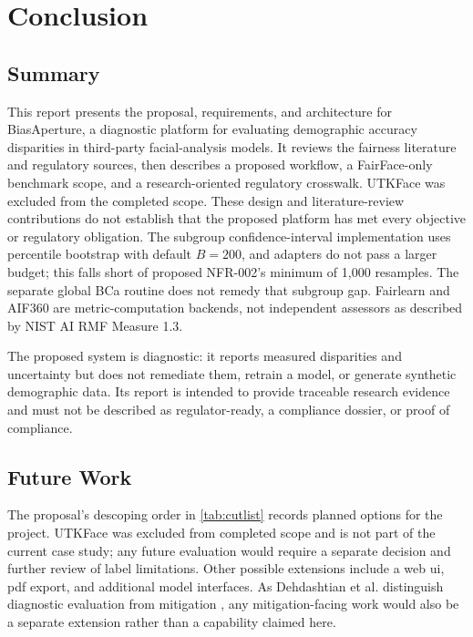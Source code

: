 \chapter{Conclusion}
\label{chap:conclusion}

\section{Summary}

This report presents the proposal, requirements, and architecture for BiasAperture, a diagnostic platform for evaluating demographic accuracy disparities in third-party facial-analysis models. It reviews the fairness literature and regulatory sources, then describes a proposed workflow, a FairFace-only benchmark scope, and a research-oriented regulatory crosswalk. UTKFace was excluded from the completed scope. These design and literature-review contributions do not establish that the proposed platform has met every objective or regulatory obligation. The subgroup confidence-interval implementation uses percentile bootstrap with default \(B=200\), and adapters do not pass a larger budget; this falls short of proposed NFR-002's minimum of 1{,}000 resamples. The separate global BCa routine does not remedy that subgroup gap. Fairlearn and AIF360 are metric-computation backends, not independent assessors as described by NIST AI RMF Measure 1.3.

The proposed system is diagnostic: it reports measured disparities and uncertainty but does not remediate them, retrain a model, or generate synthetic demographic data. Its report is intended to provide traceable research evidence and must not be described as regulator-ready, a compliance dossier, or proof of compliance.

\section{Future Work}

The proposal's descoping order in \cref{tab:cutlist} records planned options for the project. UTKFace was excluded from completed scope and is not part of the current case study; any future evaluation would require a separate decision and further review of label limitations. Other possible extensions include a web \gls{ui}, \gls{pdf} export, and additional model interfaces. As Dehdashtian et al. distinguish diagnostic evaluation from mitigation \cite{dehdashtian2024survey}, any mitigation-facing work would also be a separate extension rather than a capability claimed here.
